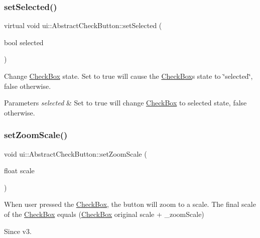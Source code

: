 \subsubsection{\texorpdfstring{set\+Selected()}{setSelected()}\hspace{0.1cm}{\footnotesize\ttfamily [2/2]}}
{\footnotesize\ttfamily virtual void ui\+::\+Abstract\+Check\+Button\+::set\+Selected (\begin{DoxyParamCaption}\item[{bool}]{selected }\end{DoxyParamCaption})\hspace{0.3cm}{\ttfamily [virtual]}}

Change \hyperlink{classui_1_1CheckBox}{Check\+Box} state. Set to true will cause the \hyperlink{classui_1_1CheckBox}{Check\+Box}\textquotesingle{}s state to \char`\"{}selected\char`\"{}, false otherwise. 
\begin{DoxyParams}{Parameters}
{\em selected} & Set to true will change \hyperlink{classui_1_1CheckBox}{Check\+Box} to selected state, false otherwise. \\
\hline
\end{DoxyParams}
\mbox{\label{classui_1_1AbstractCheckButton_ab6a9572b00f989f020ec3002af92f904}} 
\subsubsection{\texorpdfstring{set\+Zoom\+Scale()}{setZoomScale()}\hspace{0.1cm}{\footnotesize\ttfamily [1/2]}}
{\footnotesize\ttfamily void ui\+::\+Abstract\+Check\+Button\+::set\+Zoom\+Scale (\begin{DoxyParamCaption}\item[{float}]{scale }\end{DoxyParamCaption})}

When user pressed the \hyperlink{classui_1_1CheckBox}{Check\+Box}, the button will zoom to a scale. The final scale of the \hyperlink{classui_1_1CheckBox}{Check\+Box} equals (\hyperlink{classui_1_1CheckBox}{Check\+Box} original scale + \+\_\+zoom\+Scale) \begin{DoxySince}{Since}
v3. 
\end{DoxySince}
\mbox{\label{classui_1_1AbstractCheckButton_ab6a9572b00f989f020ec3002af92f904}} 
